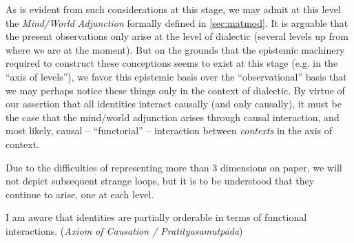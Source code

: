 \documentclass[pra,twocolumn,groupedaddress,10pt]{revtex4}
\theoremstyle{definition}
\begin{document}
\begin{enumerate}[label={[\textbf{\arabic*}]},start=0]
		As is evident from such considerations at this stage, we may admit at this level the \emph{Mind/World Adjunction} formally defined in \autoref{sec:matmod}. It is arguable that the present observations only arise at the level of dialectic (several levels up from where we are at the moment). But on the grounds that the epistemic machinery required to construct these conceptions seems to exist at this stage (e.g. in the ``axis of levels''), we favor this epistemic basis over the ``observational'' basis that we may perhaps notice these things only in the context of dialectic. By virtue of our assertion that all identities interact causally (and only causally), it must be the case that the mind/world adjunction arises through causal interaction, and most likely, causal -- ``functorial'' -- interaction between \emph{contexts} in the axis of context.

		Due to the difficulties of representing more than $3$ dimensions on paper, we will not depict subsequent strange loops, but it is to be understood that they continue to arise, one at each level.

	\item I am aware that identities are partially orderable in terms of functional interactions. (\emph{Axiom of Causation / Prat\={i}tyasamutp\={a}da})


\end{enumerate}
\end{document}

